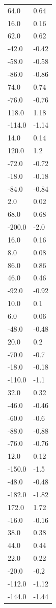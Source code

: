 \begin{longtable}{ll}
64.0 & 0.64 \\
16.0 & 0.16 \\
62.0 & 0.62 \\
-42.0 & -0.42 \\
-58.0 & -0.58 \\
-86.0 & -0.86 \\
74.0 & 0.74 \\
-76.0 & -0.76 \\
118.0 & 1.18 \\
-114.0 & -1.14 \\
14.0 & 0.14 \\
120.0 & 1.2 \\
-72.0 & -0.72 \\
-18.0 & -0.18 \\
-84.0 & -0.84 \\
2.0 & 0.02 \\
68.0 & 0.68 \\
-200.0 & -2.0 \\
16.0 & 0.16 \\
8.0 & 0.08 \\
86.0 & 0.86 \\
46.0 & 0.46 \\
-92.0 & -0.92 \\
10.0 & 0.1 \\
6.0 & 0.06 \\
-48.0 & -0.48 \\
20.0 & 0.2 \\
-70.0 & -0.7 \\
-18.0 & -0.18 \\
-110.0 & -1.1 \\
32.0 & 0.32 \\
-46.0 & -0.46 \\
-60.0 & -0.6 \\
-88.0 & -0.88 \\
-76.0 & -0.76 \\
12.0 & 0.12 \\
-150.0 & -1.5 \\
-48.0 & -0.48 \\
-182.0 & -1.82 \\
172.0 & 1.72 \\
-16.0 & -0.16 \\
38.0 & 0.38 \\
44.0 & 0.44 \\
22.0 & 0.22 \\
-20.0 & -0.2 \\
-112.0 & -1.12 \\
-144.0 & -1.44 \\

\end{longtable}
